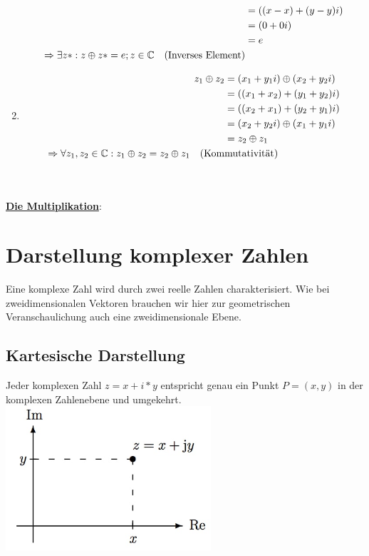 \begin{Beweis}
\begin{enumerate}[1)]
\begin{align*}
																		  														 	   &= ((x - x) + (y - y)i) \\
	  															  													 				   &= (0 + 0i) \\
																																	   &= e \\
	  					\Rightarrow \exists z*: z \oplus z* = e; z \in \mathbb{C} \quad \text{(Inverses Element)}&
	  			  \end{align*}
			\item \begin{align*}
						z_1 \oplus z_2 &= (x_1 + y_1i) \oplus (x_2 + y_2i) \\
									   &= ((x_1 + x_2) + (y_1 + y_2)i) \\
									   &= ((x_2 + x_1) + (y_2 + y_1)i) \\
									   &= (x_2 + y_2i) \oplus (x_1 + y_1i) \\
									   &= z_2 \oplus z_1 \\
						\Rightarrow \forall z_1, z_2 \in \mathbb{C}: z_1 \oplus z_2 = z_2 \oplus z_1 \quad \text{(Kom}&\text{mutativität)}
				  \end{align*}
		\end{enumerate}
		\\
		\\
		\underline{\textbf{Die Multiplikation}}:
	\end{Beweis}

\section{Darstellung komplexer Zahlen}

	Eine komplexe Zahl wird durch zwei reelle Zahlen charakterisiert. Wie bei zweidimensionalen Vektoren brauchen wir hier zur geometrischen Veranschaulichung auch eine zweidimensionale Ebene.\\

	\subsection{Kartesische Darstellung}

		Jeder komplexen Zahl $z =x+i*y$ entspricht genau ein Punkt $P =(x,y)$ in der komplexen Zahlenebene und umgekehrt.\\

		\includegraphics[width=3in]{kap6/komplexezahlen1}

